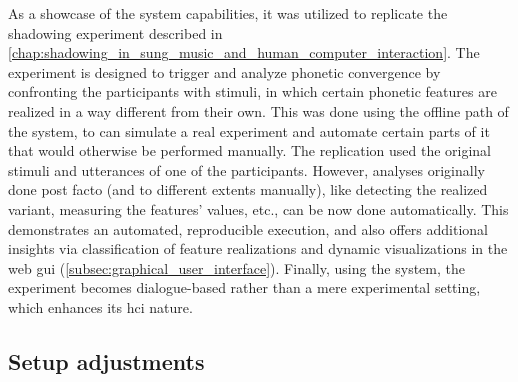 As a showcase of the system capabilities, it was utilized to replicate the shadowing experiment described in \cref{chap:shadowing_in_sung_music_and_human_computer_interaction}.
The experiment is designed to trigger and analyze phonetic convergence by confronting the participants with stimuli, in which certain phonetic features are realized in a way different from their own.
This was done using the offline path of the system, to can simulate a real experiment and automate certain parts of it that would otherwise be performed manually.
The replication used the original stimuli and utterances of one of the participants.
However, analyses originally done post facto (and to different extents manually), like detecting the realized variant, measuring the features' values, etc., can be now done automatically.
This demonstrates an automated, reproducible execution, and also offers additional insights via classification of feature realizations and dynamic visualizations in the web \ac{gui} (\cref{subsec:graphical_user_interface}).
Finally, using the system, the experiment becomes dialogue-based rather than a mere experimental setting, which enhances its \ac{hci} nature.

\subsection{Setup adjustments}
\label{subsec:setup_adjustments}

